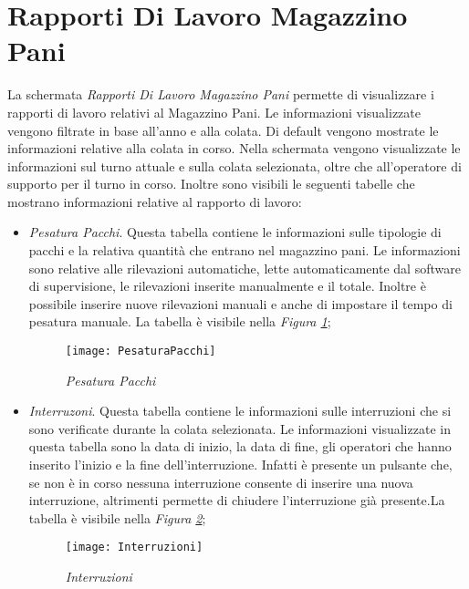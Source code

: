   \section{Rapporti Di Lavoro Magazzino Pani}
  La schermata \textit{Rapporti Di Lavoro Magazzino Pani} permette di visualizzare
  i rapporti di lavoro relativi al Magazzino Pani. Le informazioni visualizzate vengono filtrate in base
  all'anno e alla colata. Di default vengono mostrate le informazioni relative alla colata in corso. Nella schermata vengono
  visualizzate le informazioni sul turno attuale e sulla colata selezionata, oltre che all'operatore di supporto per il turno
  in corso. Inoltre sono visibili le seguenti tabelle che mostrano informazioni relative al rapporto di lavoro:
  \begin{itemize}
    \item \textit{Pesatura Pacchi}. Questa tabella contiene le informazioni sulle tipologie di pacchi e la relativa quantità
    che entrano nel magazzino pani. Le informazioni sono relative alle rilevazioni automatiche, lette automaticamente dal
    software di supervisione, le rilevazioni inserite manualmente e il totale. Inoltre è possibile inserire nuove rilevazioni
    manuali e anche di impostare il tempo di pesatura manuale. La tabella è visibile nella 
    \textit{Figura \ref{fig:PesaturaPacchi}};

    \begin{figure}[H]
      \texttt{[image: PesaturaPacchi]}
      \centering
      \caption{\textit{Pesatura Pacchi}}
      \label{fig:PesaturaPacchi}
    \end{figure}

    \item \textit{Interruzoni}. Questa tabella contiene le informazioni sulle interruzioni che si sono verificate durante la
    colata selezionata. Le informazioni visualizzate in questa tabella sono la data di inizio, la data di fine, gli operatori
    che hanno inserito l'inizio e la fine dell'interruzione. Infatti è presente un pulsante che, se non è in corso nessuna interruzione
    consente di inserire una nuova interruzione, altrimenti permette di chiudere l'interruzione già presente.La tabella è
    visibile nella \textit{Figura \ref{fig:Interruzioni}};

    \begin{figure}[H]
      \texttt{[image: Interruzioni]}
      \centering
      \caption{\textit{Interruzioni}}
      \label{fig:Interruzioni}
    \end{figure}


\end{itemize}
